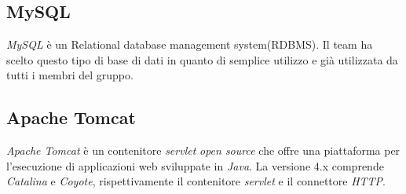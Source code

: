 \subsection{MySQL}
\textit{MySQL} è un Relational database management system(RDBMS). Il team ha scelto questo tipo di base di dati in quanto di semplice utilizzo e già utilizzata da tutti i membri del gruppo.
\subsection{Apache Tomcat}
\textit{Apache Tomcat} è un contenitore \textit{servlet} \textit{open source} che offre una piattaforma per l'esecuzione di applicazioni web sviluppate in \textit{Java}. La versione 4.x comprende \textit{Catalina} e \textit{Coyote}, rispettivamente il contenitore \textit{servlet} e il connettore \textit{HTTP}.